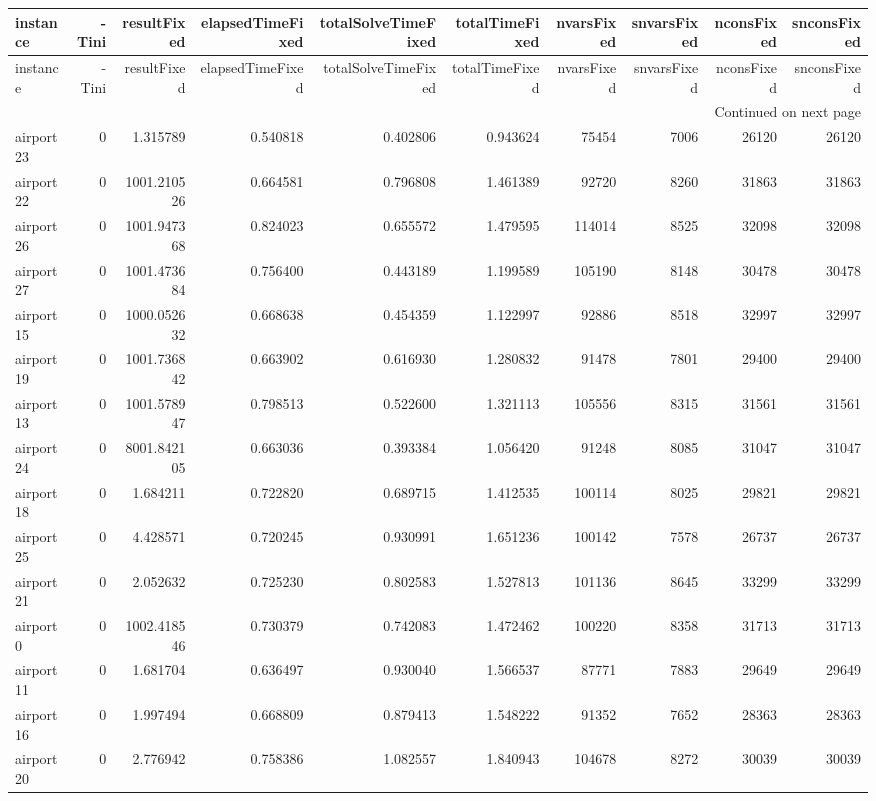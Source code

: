 
\begin{longtable}{|l|r|r|r|r|r|r|r|r|r|}
\toprule
instance & -Tini & resultFixed & elapsedTimeFixed & totalSolveTimeFixed & totalTimeFixed & nvarsFixed & snvarsFixed & nconsFixed & snconsFixed \\
\midrule
\endfirsthead
\toprule
instance & -Tini & resultFixed & elapsedTimeFixed & totalSolveTimeFixed & totalTimeFixed & nvarsFixed & snvarsFixed & nconsFixed & snconsFixed \\
\midrule
\endhead
\midrule
\multicolumn{10}{r}{Continued on next page} \\
\midrule
\endfoot
\bottomrule
\endlastfoot
airport23 & 0 & 1.315789 & 0.540818 & 0.402806 & 0.943624 & 75454 & 7006 & 26120 & 26120 \\
airport22 & 0 & 1001.210526 & 0.664581 & 0.796808 & 1.461389 & 92720 & 8260 & 31863 & 31863 \\
airport26 & 0 & 1001.947368 & 0.824023 & 0.655572 & 1.479595 & 114014 & 8525 & 32098 & 32098 \\
airport27 & 0 & 1001.473684 & 0.756400 & 0.443189 & 1.199589 & 105190 & 8148 & 30478 & 30478 \\
airport15 & 0 & 1000.052632 & 0.668638 & 0.454359 & 1.122997 & 92886 & 8518 & 32997 & 32997 \\
airport19 & 0 & 1001.736842 & 0.663902 & 0.616930 & 1.280832 & 91478 & 7801 & 29400 & 29400 \\
airport13 & 0 & 1001.578947 & 0.798513 & 0.522600 & 1.321113 & 105556 & 8315 & 31561 & 31561 \\
airport24 & 0 & 8001.842105 & 0.663036 & 0.393384 & 1.056420 & 91248 & 8085 & 31047 & 31047 \\
airport18 & 0 & 1.684211 & 0.722820 & 0.689715 & 1.412535 & 100114 & 8025 & 29821 & 29821 \\
airport25 & 0 & 4.428571 & 0.720245 & 0.930991 & 1.651236 & 100142 & 7578 & 26737 & 26737 \\
airport21 & 0 & 2.052632 & 0.725230 & 0.802583 & 1.527813 & 101136 & 8645 & 33299 & 33299 \\
airport0 & 0 & 1002.418546 & 0.730379 & 0.742083 & 1.472462 & 100220 & 8358 & 31713 & 31713 \\
airport11 & 0 & 1.681704 & 0.636497 & 0.930040 & 1.566537 & 87771 & 7883 & 29649 & 29649 \\
airport16 & 0 & 1.997494 & 0.668809 & 0.879413 & 1.548222 & 91352 & 7652 & 28363 & 28363 \\
airport20 & 0 & 2.776942 & 0.758386 & 1.082557 & 1.840943 & 104678 & 8272 & 30039 & 30039 \\

\end{longtable}
